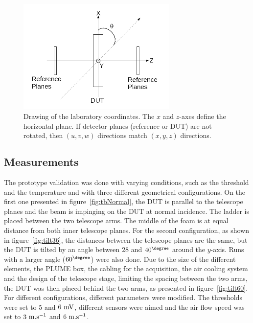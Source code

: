    \begin{figure}[!tbh]
      \centering
      \includegraphics[width = 0.7\textwidth]{Pictures/deformation/lab_frame.png}
      \caption{Drawing of the laboratory coordinates. The $x$ and $z$-axes define the horizontal plane. If detector planes (reference or DUT) are not rotated, then $(u,v,w)$ directions match $(x,y,z)$ directions.}
      \label{fig:labCoordinates}
    \end{figure}

    \subsection{Measurements}

    The prototype validation was done with varying conditions, such as the threshold and the temperature and with three different geometrical configurations.
    On the first one presented in figure~\ref{fig:tbNormal}, the \gls{DUT} is parallel to the telescope planes and the beam is impinging on the \gls{DUT} at normal incidence.
    The ladder is placed between the two telescope arms.
    The middle of the foam is at equal distance from both inner telescope planes.
    For the second configuration, as shown in figure~\ref{fig:tilt36}, the distances between the telescope planes are the same, but the \gls{DUT} is tilted by an angle between $28$ and $40^{\degree}$ around the $y$-axis.
    Runs with a larger angle ($60^{\degree}$) were also done.
    Due to the size of the different elements, the \gls{PLUME} box, the cabling for the acquisition, the air cooling system and the design of the telescope stage, limiting the spacing between the two arms, the \gls{DUT} was then placed behind the two arms, as presented in figure~\ref{fig:tilt60}.
    For different configurations, different parameters were modified.
    The thresholds were set to $5$ and $6~\rm{mV}$, different sensors were aimed and the air flow speed was set to $3~\rm{m.s}^{-1}$ and $6~\rm{m.s}^{-1}$.

